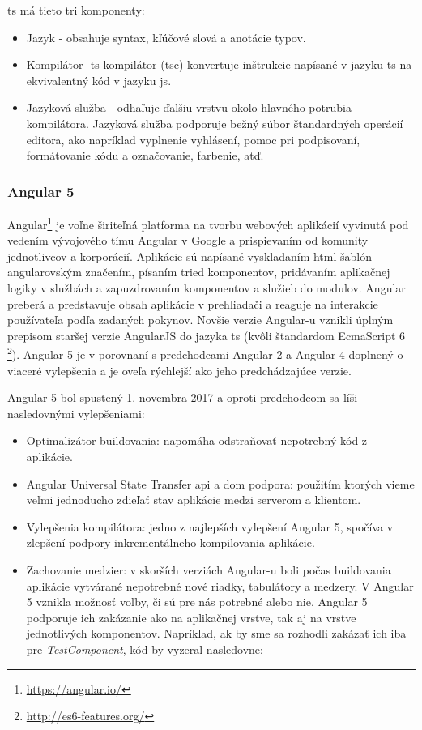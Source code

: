 \acrlong{ts} má tieto tri komponenty:
\begin{itemize}
\item Jazyk - obsahuje syntax, kľúčové slová a anotácie typov.
\item Kompilátor- \acrlong{ts} kompilátor (tsc) konvertuje inštrukcie napísané v jazyku
\acrlong{ts} na ekvivalentný kód v jazyku \acrlong{js}.
\item Jazyková služba - odhaľuje ďalšiu vrstvu okolo hlavného
potrubia kompilátora. Jazyková služba podporuje bežný súbor štandardných
operácií editora, ako napríklad vyplnenie vyhlásení, pomoc pri podpisovaní,
formátovanie kódu a označovanie, farbenie, atď.
\end{itemize}

\subsubsection{Angular 5}
\label{subsubsec:angular5}

Angular\footnote{\url{https://angular.io/}} je voľne širiteľná platforma na tvorbu webových aplikácií vyvinutá pod
vedením vývojového tímu Angular v Google a prispievaním od komunity jednotlivcov
a korporácií. Aplikácie sú napísané vyskladaním \acrshort{html} šablón angularovským značením,
písaním tried komponentov, pridávaním aplikačnej logiky v službách a zapuzdrovaním
komponentov a služieb do modulov. Angular preberá a predstavuje obsah aplikácie
v prehliadači a reaguje na interakcie používateľa podľa zadaných pokynov.
Novšie verzie Angular-u vznikli úplným prepisom staršej verzie AngularJS do jazyka
\acrlong{ts} (kvôli štandardom EcmaScript 6 \footnote{\url{http://es6-features.org/}}).
Angular 5 je v porovnaní s predchodcami Angular 2 a Angular 4 doplnený o viaceré vylepšenia
a je oveľa rýchlejší ako jeho predchádzajúce verzie.

Angular 5 bol spustený 1. novembra 2017 a oproti predchodcom sa líši nasledovnými 
vylepšeniami:
\begin{itemize}
\item Optimalizátor buildovania: 
napomáha odstraňovať nepotrebný kód z aplikácie.
\item Angular Universal State Transfer \acrshort{api} a \acrshort{dom} podpora: 
použitím ktorých vieme veľmi jednoducho zdieľať stav aplikácie medzi serverom a klientom.
\item Vylepšenia kompilátora: 
jedno z najlepších vylepšení Angular 5, spočíva v zlepšení podpory inkrementálneho 
kompilovania aplikácie.
\item Zachovanie medzier: 
v skorších verziách Angular-u boli počas buildovania aplikácie vytvárané nepotrebné 
nové riadky, tabulátory a medzery. V Angular 5 vznikla možnosť voľby, či sú pre nás 
potrebné alebo nie. Angular 5 podporuje ich zakázanie ako na aplikačnej vrstve, tak 
aj na vrstve jednotlivých komponentov. Napríklad, ak by sme sa rozhodli zakázať ich 
iba pre \textit{TestComponent}, kód by vyzeral nasledovne:
\end{itemize}

